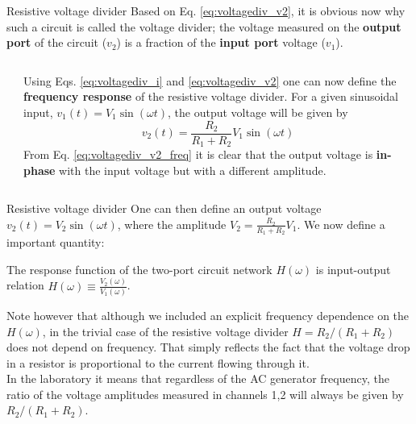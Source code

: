 \begin{frame}{Resistive voltage divider}
Based on Eq. \ref{eq:voltagediv_v2}, it is obvious now why such a circuit is called the voltage divider; the voltage measured on the \textbf{output port} of the circuit ($v_2$) is a fraction of the \textbf{input port} voltage ($v_1$).
	\begin{columns}
		\begin{column}{0.4\textwidth}
		\end{column}
		\begin{column}{0.6\textwidth}
		Using Eqs. \ref{eq:voltagediv_i} and \ref{eq:voltagediv_v2} one can now define the \textbf{frequency response} of the resistive voltage divider. For a given sinusoidal input, $v_1(t)=V_1\sin(\omega t)$, the output voltage will be given by 
\begin{equation}
  v_2(t)=\frac{R_2}{R_1+R_2}V_1\sin(\omega t)
  \label{eq:voltagediv_v2_freq}
\end{equation}
From Eq. \ref{eq:voltagediv_v2_freq} it is clear that the output voltage is \textbf{in-phase} with the input voltage but with a different amplitude.

		\end{column}
	\end{columns}
\end{frame}

\begin{frame}{Resistive voltage divider}
One can then define an output voltage $v_2(t)=V_2\sin(\omega t)$, where the amplitude $V_2=\frac{R_2}{R_1+R_2}V_1$. We now define a important quantity:
\begin{definition}
The response function of the two-port circuit network $H(\omega)$ is input-output relation $H(\omega)\equiv\frac{V_2(\omega)}{V_1(\omega)}$.
\end{definition}
Note however that although we included an explicit frequency dependence on the $H(\omega)$, in the trivial case of the resistive voltage divider $H=R_2/(R_1+R_2)$ does not depend on frequency. That simply reflects the fact that the voltage drop in a resistor is proportional to the current flowing through it.\\ In the laboratory it means that regardless of the AC generator frequency, the ratio of the voltage amplitudes measured in channels 1,2 will always be given by  $R_2/(R_1+R_2)$.
%			
\end{frame}


